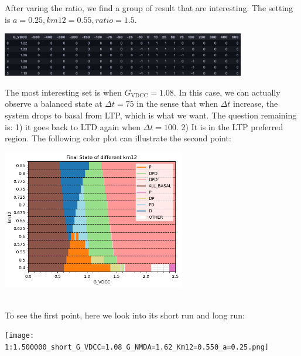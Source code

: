 \documentclass{article}
\begin{document}
After varing the ratio, we find a group of result that are interesting. The setting is $a=0.25,km12=0.55,ratio=1.5$. \\
\begin{minipage}{\textwidth} %
    \centering
    \includegraphics[width=0.8\textwidth]{result1.png} %
    \label{fig:a0.25}
\end{minipage}
The most interesting set is when $G_{\text{VDCC}}=1.08$. In this case, we can actually observe a balanced state at $\Delta t=75$ in the sense that when $\Delta t$ increase, the system drops to basal from LTP, which is what we want. The question remaining is: 1) it goes back to LTD again when $\Delta t=100$. 2) It is in the LTP preferred region. The following color plot can illustrate the second point:
\\
\begin{minipage}{\textwidth} %
    \centering
    \includegraphics[width=0.6\textwidth]{a=0.25_final_state_1:1.5.png} %
    \label{fig:a0.25}
\end{minipage}\\
To see the first point, here we look into its short run and long run:\\
\begin{minipage}{\textwidth} %
    \centering
    \texttt{[image: 1:1.500000\_short\_G\_VDCC=1.08\_G\_NMDA=1.62\_Km12=0.550\_a=0.25.png]} %
    \label{fig:a0.25}
\end{minipage}\\
\end{document}
